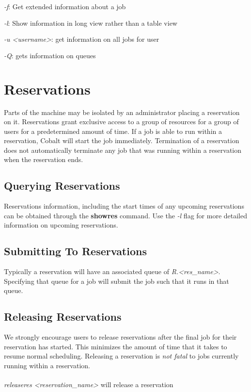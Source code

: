 \documentclass[12pt,letterpaper]{article}
\begin{document}
\begin{list}{}{}
\item \textit{-f}: Get extended information about a job
\item \textit{-l}: Show information in long view rather than a table view
\item \textit{-u \textless username\textgreater}: get information on all jobs for user
\item \textit{-Q}: gets information on queues
\end{list}

\section*{Reservations}
Parts of the machine may be isolated by an administrator placing a reservation on it.  Reservations grant exclusive access to a group of resources for a group of users for a predetermined amount of time.  If a job is able to run within a reservation, Cobalt will start the job immediately.  Termination of a reservation does not automatically terminate any job that was running within a reservation when the reservation ends.  

\subsection*{Querying Reservations}
Reservations information, including the start times of any upcoming reservations can be obtained through the \textbf{showres} command.  Use the \textit{-l} flag for more detailed information on upcoming reservations. 

\subsection*{Submitting To Reservations}
Typically a reservation will have an associated queue of \textit{R.\textless res\_name\textgreater}.  Specifying that queue for a job will submit the job such that it runs in that queue.

\subsection*{Releasing Reservations}
We strongly encourage users to release reservations after the final job for their reservation has started.  This minimizes the amount of time that it takes to resume normal scheduling.  Releasing a reservation is \textit{not fatal} to jobs currently running within a reservation.  
\\
\\
\textit{releaseres \textless reservation\_name\textgreater} will release a reservation
\end{document}
